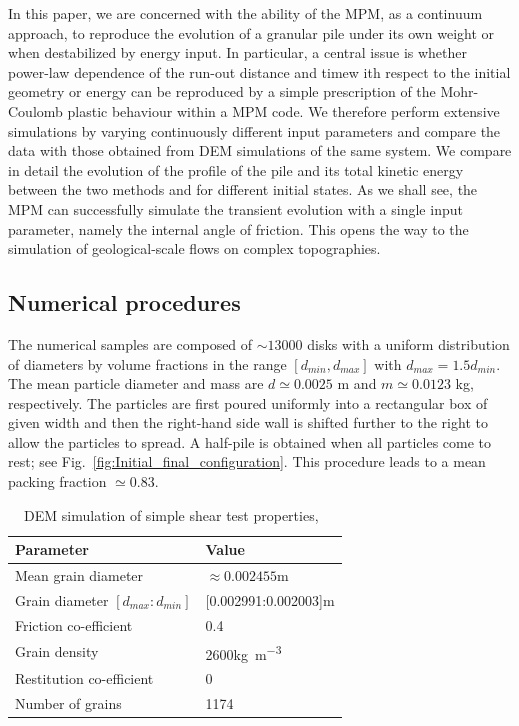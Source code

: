 In this paper, we are concerned with the ability of the MPM, as a continuum 
approach, to reproduce the evolution of a granular pile 
under its own weight or when destabilized by energy input. In particular, 
a central issue is whether power-law dependence of the run-out distance 
and timew ith respect to the initial geometry or energy can be reproduced 
by a simple prescription of the Mohr-Coulomb plastic behaviour within a  
MPM code. We therefore perform extensive simulations by varying continuously 
different input parameters and compare the data with those obtained from 
DEM simulations of the same system. We compare in detail the evolution of 
the profile of the pile and its total kinetic energy between the two methods 
and for different initial states. As we shall see, the MPM can successfully 
simulate the transient evolution with a single input parameter, namely the 
internal angle of friction. This opens the way to the simulation of 
geological-scale flows on complex topographies.  
  

\subsection{Numerical procedures}
\label{sec:num}

The numerical samples are composed of $\sim13000$ disks with a uniform 
distribution of diameters by volume fractions in the range $[d_{min}, 
d_{max}]$ with $d_{max} = 1.5 d_{min}$. The mean particle diameter and 
mass are $d\simeq 0.0025 $ m and $m\simeq 0.0123$ kg, respectively. 
The particles are first poured uniformly into a rectangular box of given width 
and then the right-hand side wall is shifted further to the right to allow the 
particles to spread. A half-pile is obtained when all particles come to 
rest; see Fig.~\ref{fig:Initial_final_configuration}. This procedure leads to a 
mean packing fraction $\simeq 0.83$.



\begin{table}[tbhp]
\caption{DEM simulation of simple shear test properties,~\citep{Mutabaruka2013}}
\label{table:CD_Shear}
\centering
\begin{tabular}{ll}
\toprule
\textbf{Parameter} & \textbf{Value} \\ \midrule
Mean grain diameter & $\approx 0.002455$\si{\m} \\
Grain diameter $[d_{max}:d_{min}]$ & [0.002991:0.002003]\si{\m} \\
Friction co-efficient & 0.4\\
Grain density & 2600\si{\kg\per\meter\cubed} \\
Restitution co-efficient  & $0$\\
Number of grains & 1174 \\
\bottomrule
\end{tabular}
\end{table}


